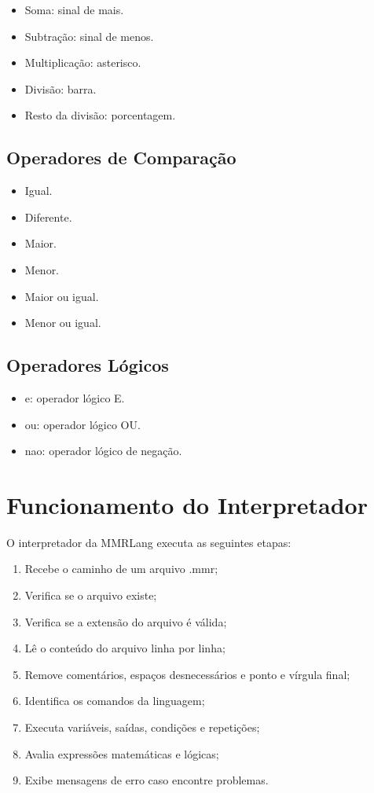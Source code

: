 \documentclass[12pt,a4paper]{article}
\begin{document}
\begin{itemize}
\item Soma: sinal de mais.
\item Subtração: sinal de menos.
\item Multiplicação: asterisco.
\item Divisão: barra.
\item Resto da divisão: porcentagem.
\end{itemize}

\subsection{Operadores de Comparação}

\begin{itemize}
\item Igual.
\item Diferente.
\item Maior.
\item Menor.
\item Maior ou igual.
\item Menor ou igual.
\end{itemize}

\subsection{Operadores Lógicos}

\begin{itemize}
\item e: operador lógico E.
\item ou: operador lógico OU.
\item nao: operador lógico de negação.
\end{itemize}

\section{Funcionamento do Interpretador}

O interpretador da MMRLang executa as seguintes etapas:

\begin{enumerate}
\item Recebe o caminho de um arquivo .mmr;
\item Verifica se o arquivo existe;
\item Verifica se a extensão do arquivo é válida;
\item Lê o conteúdo do arquivo linha por linha;
\item Remove comentários, espaços desnecessários e ponto e vírgula final;
\item Identifica os comandos da linguagem;
\item Executa variáveis, saídas, condições e repetições;
\item Avalia expressões matemáticas e lógicas;
\item Exibe mensagens de erro caso encontre problemas.
\end{enumerate}
\end{document}
